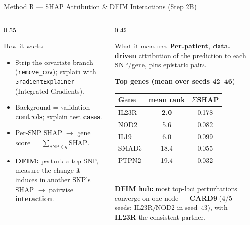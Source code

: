 \documentclass[aspectratio=169]{beamer}
\begin{document}
\begin{frame}{Method B — SHAP Attribution \& DFIM Interactions (Step 2B)}
    \small
    \begin{columns}[T]
        \begin{column}{0.55\textwidth}
            \begin{block}{How it works}
                \footnotesize
                \begin{itemize}
                    \item Strip the covariate branch (\texttt{remove\_cov}); explain with \texttt{GradientExplainer} (Integrated Gradients).
                    \item Background = validation \textbf{controls}; explain test \textbf{cases}.
                    \item Per-SNP SHAP $\rightarrow$ gene score $=\sum_{\text{SNP}\in g}\text{SHAP}$.
                    \item \textbf{DFIM:} perturb a top SNP, measure the change it induces in another SNP's SHAP $\rightarrow$ pairwise \textbf{interaction}.
                \end{itemize}
            \end{block}
        \end{column}
        \begin{column}{0.45\textwidth}
            \begin{block}{What it measures}
                \footnotesize
                \textbf{Per-patient, data-driven} attribution of the prediction to each SNP/gene, plus epistatic pairs.
            \end{block}
            \centering
            \scriptsize
            \textbf{Top genes (mean over seeds 42--46)}\\[2pt]
            \begin{tabular}{l c c}
                \toprule
                Gene & mean rank & $\Sigma$SHAP \\
                \midrule
                IL23R & \textbf{2.0} & 0.178 \\
                NOD2  & 5.6 & 0.082 \\
                IL19  & 6.0 & 0.099 \\
                SMAD3 & 18.4 & 0.055 \\
                PTPN2 & 19.4 & 0.032 \\
                \bottomrule
            \end{tabular}\\[3pt]
            \footnotesize \textbf{DFIM hub:} most top-loci perturbations converge on one node --- \textbf{CARD9} (4/5 seeds; IL23R/NOD2 in seed~43), with \textbf{IL23R} the consistent partner.
        \end{column}
    \end{columns}
\end{frame}
\end{document}
